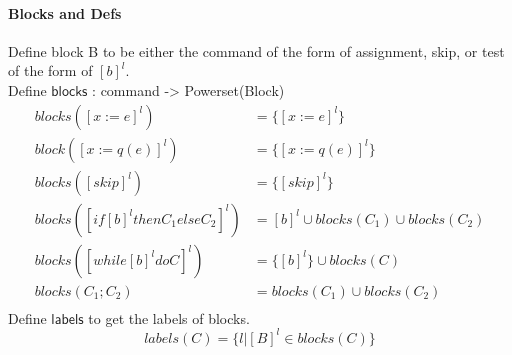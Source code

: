 \paragraph*{Blocks and Defs}
 Define block B to be either the command of the form of assignment, skip, or test of the form of $[b]^{l}$.\\
 Define $\mathsf{blocks}$ : command -> Powerset(Block)
 \[
 \begin{array}{ll}
    blocks([x := e]^{l})  & = \{[x := e]^{l}\}  \\
     block([x := q(e)]^{l})  & = \{[x := q(e)]^{l}\}  \\
     blocks([skip]^{l})  & = \{[skip]^{l}\} \\
     blocks([if [b]^l then C_1 else C_2]^{l})  & = {[b]^{l}} \cup blocks(C_1) \cup blocks(C_2) \\
     blocks([while [b]^l do C]^{l})  & = \{[b]^{l}\} \cup blocks(C) \\
     blocks(C_1 ; C_2)  & = blocks(C_1) \cup  blocks(C_2) \\
 \end{array}
 \]
 Define $\mathsf{labels}$ to get the labels of blocks.
 \[
   labels(C) = \{l | [B]^{l} \in blocks(C) \}
 \]  

